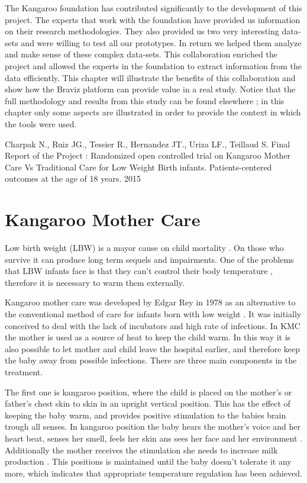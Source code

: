 \label{chap_kmc400}



The Kangaroo foundation has contributed significantly to the development of this project. The experts that work with the foundation have provided us information on their research methodologies. They also provided us two very interesting data-sets and were willing to test all our prototypes. In return we helped them analyze and make sense of these complex data-sets. This collaboration enriched the project and allowed the experts in the foundation to extract information from the data efficiently. This chapter will illustrate the benefits of this collaboration and show how the Braviz platform can provide value in a real study. Notice that the full methodology and results from this study can be found elsewhere \autocite{KMC400}; in this chapter only some aspects are illustrated in order to provide the context in which the tools were used.


Charpak N., Ruiz JG., Tessier R., Hernandez JT., Uriza LF., Teillaud S. Final Report of the Project : Randomized open controlled trial on Kangaroo Mother Care Vs Traditional Care for Low Weight Birth infants. Patients-centered outcomes at the age of 18 years. 2015

\section{Kangaroo Mother Care}

Low birth weight (LBW) is a mayor cause on child mortality \autocite{wardlaw_low_2005}. On those who survive it can produce long term sequels and impairments. One of the problems that LBW infants face is that they can't control their body temperature \autocite{DONDE}, therefore it is necessary to warm them externally.

Kangaroo mother care was developed by Edgar Rey in 1978 \autocite{rey_rational_1983} as an alternative to the conventional method of care for infants born with low weight \autocite{conde-agudelo_kangaroo_2003}. It was initially conceived to deal with the lack of incubators and high rate of infections. In KMC the mother is used as a source of heat to keep the child warm. In this way it is also possible to let mother and child leave the hospital earlier, and therefore keep the baby away from possible infections. There are three main components in the treatment.

The first one is kangaroo position, where the child is placed on the mother's or father's chest skin to skin in an upright vertical position. This has the effect  of keeping the baby warm, and provides positive stimulation to the babies brain trough all senses. In kangaroo position the baby hears the mother's voice and her heart beat, senses her smell, feels her skin ans sees her face and her environment \autocite{tessier_kangaroo_2003}. Additionally the mother receives the stimulation she needs to increase milk production \autocite{charpak_kangaroo_2005}. This positions is maintained until the baby doesn't tolerate it any more, which indicates that appropriate temperature regulation has been achieved. 

